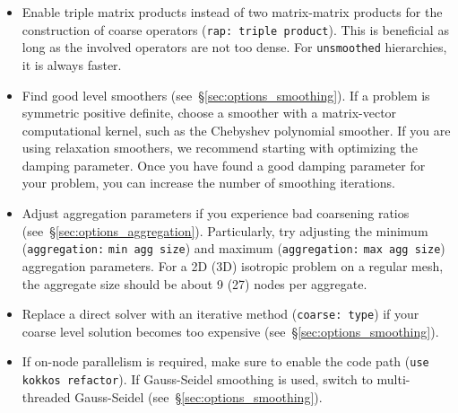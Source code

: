 \begin{itemize}
  \item
    Enable triple matrix products instead of two matrix-matrix products for
    the construction of coarse operators (\texttt{rap: triple product}).
    This is beneficial as long as the involved operators are not too dense.
    For \texttt{unsmoothed} hierarchies, it is always faster.

  \item
    Find good level smoothers (see~\S\ref{sec:options_smoothing}). If a problem
    is symmetric positive definite, choose a smoother with a matrix-vector
    computational kernel, such as the Chebyshev polynomial smoother. If you are
    using relaxation smoothers, we recommend starting with optimizing the
    damping parameter. Once you have found a good damping parameter for your
    problem, you can increase the number of smoothing iterations.

  \item
    Adjust aggregation parameters if you experience bad coarsening ratios
    (see~\S\ref{sec:options_aggregation}). Particularly, try adjusting the
    minimum (\texttt{aggregation:} \texttt{min agg size}) and maximum
    (\texttt{aggregation:} \texttt{max agg size}) aggregation parameters. For a
    2D (3D) isotropic problem on a regular mesh, the aggregate size should be
    about 9 (27) nodes per aggregate.

  \item
    Replace a direct solver with an iterative method (\texttt{coarse: type}) if
    your coarse level solution becomes too expensive (see~\S\ref{sec:options_smoothing}).

  \item
    If on-node parallelism is required, make sure to enable the \kokkos code path (\texttt{use kokkos refactor}).
    If Gauss-Seidel smoothing is used, switch to multi-threaded Gauss-Seidel (see~\S\ref{sec:options_smoothing}).

\end{itemize}

